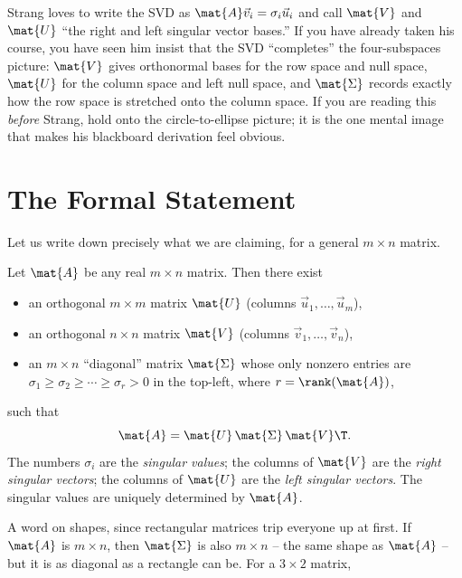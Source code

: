 \begin{strangbox}
Strang loves to write the SVD as $\mat{A}\vec{v}_i = \sigma_i \vec{u}_i$ and call
$\mat{V}$ and $\mat{U}$ ``the right and left singular vector bases.'' If you have
already taken his course, you have seen him insist that the SVD ``completes'' the
four-subspaces picture: $\mat{V}$ gives orthonormal bases for the row space and
null space, $\mat{U}$ for the column space and left null space, and $\mat{\Sigma}$
records exactly how the row space is stretched onto the column space. If you are
reading this \emph{before} Strang, hold onto the circle-to-ellipse picture; it is
the one mental image that makes his blackboard derivation feel obvious.
\end{strangbox}

\section{The Formal Statement}
\label{ch29:formal-statement}

Let us write down precisely what we are claiming, for a general $m \times n$
matrix.

\begin{formalbox}
\begin{theorem}
\label{ch29:thm-svd}
Let $\mat{A}$ be any real $m \times n$ matrix. Then there exist
\begin{itemize}
  \item an orthogonal $m \times m$ matrix $\mat{U}$ (columns $\vec{u}_1,\dots,\vec{u}_m$),
  \item an orthogonal $n \times n$ matrix $\mat{V}$ (columns $\vec{v}_1,\dots,\vec{v}_n$),
  \item an $m \times n$ ``diagonal'' matrix $\mat{\Sigma}$ whose only nonzero
        entries are $\sigma_1 \ge \sigma_2 \ge \cdots \ge \sigma_r > 0$ in the
        top-left, where $r = \rank(\mat{A})$,
\end{itemize}
such that
\[
  \mat{A} = \mat{U}\,\mat{\Sigma}\,\mat{V}\T.
\]
The numbers $\sigma_i$ are the \emph{singular values}; the columns of $\mat{V}$
are the \emph{right singular vectors}; the columns of $\mat{U}$ are the
\emph{left singular vectors}. The singular values are uniquely determined by
$\mat{A}$.
\end{theorem}
\end{formalbox}

A word on shapes, since rectangular matrices trip everyone up at first. If
$\mat{A}$ is $m \times n$, then $\mat{\Sigma}$ is also $m \times n$ -- the same
shape as $\mat{A}$ -- but it is as diagonal as a rectangle can be. For a
$3 \times 2$ matrix,

